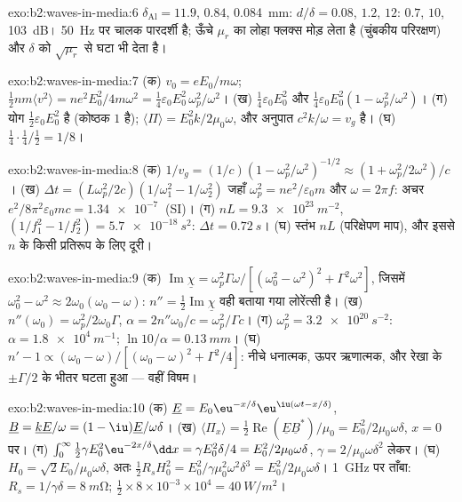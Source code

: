 \begin{solution}{exo:b2:waves-in-media:6}
$\delta_{\text{Al}} = 11.9$, $0.84$, \qty{0.084}{mm}: $d/\delta = 0.08$, $1.2$, $12$: $0.7$,
$10$, \qty{103}{dB}। \qty{50}{Hz} पर चालक पारदर्शी है; ऊँचे
$\mu_r$ का लोहा फ्लक्स मोड़ लेता है (चुंबकीय परिरक्षण) और $\delta$ को
$\sqrt{\mu_r}$ से घटा भी देता है।
\end{solution}

\begin{solution}{exo:b2:waves-in-media:7}
(क) $v_0 = eE_0/m\omega$; $\tfrac12nm\langle v^2\rangle = ne^2E_0^2/4m\omega^2 = \tfrac14\varepsilon_0
E_0^2\,\omega_p^2/\omega^2$। (ख) $\tfrac14\varepsilon_0E_0^2$ और $\tfrac14\varepsilon_0E_0^2(1 - \omega_p^2/
\omega^2)$। (ग) योग $\tfrac12\varepsilon_0E_0^2$ है (कोष्ठक $1$ है); $\langle\Pi
\rangle = E_0^2k/2\mu_0\omega$, और अनुपात $c^2k/\omega = v_g$ है। (घ) $\tfrac14\cdot\tfrac14
/\tfrac12 = 1/8$।
\end{solution}

\begin{solution}{exo:b2:waves-in-media:8}
(क) $1/v_g = (1/c)(1 - \omega_p^2/\omega^2)^{-1/2} \approx (1 + \omega_p^2/2\omega^2)/c$। (ख) $\Delta t
= (L\omega_p^2/2c)(1/\omega_1^2 - 1/\omega_2^2)$ जहाँ $\omega_p^2 = ne^2/\varepsilon_0m$ और $\omega =
2\pi f$: अचर $e^2/8\pi^2\varepsilon_0mc = \qty{1.34e-7}{}$ (SI)। (ग) $nL = \qty{9.3e23}{m^{-2}}$,
$(1/f_1^2 - 1/f_2^2) = \qty{5.7e-18}{s^2}$: $\Delta t = \qty{0.72}{s}$। (घ) स्तंभ $nL$
(परिक्षेपण माप), और इससे $n$ के किसी प्रतिरूप के लिए दूरी।
\end{solution}

\begin{solution}{exo:b2:waves-in-media:9}
(क) $\operatorname{Im}\underline\chi = \omega_p^2\Gamma\omega/[(\omega_0^2 - \omega^2)^2 + \Gamma^2\omega^2]$, जिसमें
$\omega_0^2 - \omega^2 \approx 2\omega_0(\omega_0 - \omega)$: $n'' = \tfrac12\operatorname{Im}\underline\chi$ वही
बताया गया लोरेंत्सी है। (ख) $n''(\omega_0) = \omega_p^2/2\omega_0\Gamma$, $\alpha = 2n''\omega_0/c =
\omega_p^2/\Gamma c$। (ग) $\omega_p^2 = \qty{3.2e20}{s^{-2}}$: $\alpha = \qty{1.8e4}{m^{-1}}$;
$\ln10/\alpha = \qty{0.13}{mm}$। (घ) $n' - 1 \propto (\omega_0 - \omega)/[(\omega_0 - \omega)^2 +
\Gamma^2/4]$: नीचे धनात्मक, ऊपर ऋणात्मक, और रेखा के $\pm\Gamma/2$ के
भीतर घटता हुआ --- वहीं विषम।
\end{solution}

\begin{solution}{exo:b2:waves-in-media:10}
(क) $\underline E = E_0\eu^{-x/\delta}\eu^{\iu(\omega t - x/\delta)}$, $\underline B = \underline k\underline E/\omega
= (1 - \iu)\underline E/\omega\delta$। (ख) $\langle\Pi_x\rangle = \tfrac12\operatorname{Re}(\underline E
\underline B^*)/\mu_0 = E_0^2/2\mu_0\omega\delta$, $x = 0$ पर। (ग) $\int_0^\infty\tfrac12\gamma E_0^2
\eu^{-2x/\delta}\dd x = \gamma E_0^2\delta/4 = E_0^2/2\mu_0\omega\delta$, $\gamma = 2/\mu_0\omega\delta^2$ लेकर।
(घ) $H_0 = \sqrt2E_0/\mu_0\omega\delta$, अतः $\tfrac12R_sH_0^2 = E_0^2/\gamma\mu_0^2\omega^2\delta^3 =
E_0^2/2\mu_0\omega\delta$। \qty{1}{GHz} पर ताँबा: $R_s = 1/\gamma\delta = \qty{8}{m\ohm}$;
$\tfrac12 \times 8 \times 10^{-3} \times 10^4 = \qty{40}{W/m^2}$।
\end{solution}

